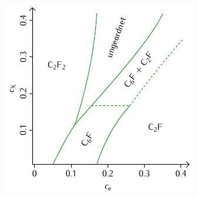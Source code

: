 \documentclass{beamer}
\begin{document}
\begin{frame}
\begin{figure}
\begin{minipage}[b]{0.4\textwidth}
			\end{minipage}
			\begin{minipage}[b]{0.4\textwidth}
				\includegraphics[width=\textwidth]{Abbildungen/Phasendiagramme/Schemata/F.pdf}

\end{minipage}
\end{figure}
\end{frame}
\end{document}
